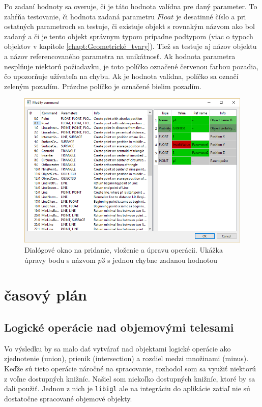 Po zadaní hodnoty sa overuje, či je táto hodnota valídna pre daný parameter. To zahŕňa testovanie, či hodnota zadaná parametru $Float$ je desatinné číslo a pri ostatných parametroch sa testuje, či existuje objekt s rovnakým názvom ako bol zadaný a či je tento objekt správnym typom prípadne podtypom (viac o typoch objektov v kapitole  \ref{chapt:Geometrické_tvary}). Tiež sa testuje aj názov objektu a názov referencovaného parametra na unikátnosť.
Ak hodnota parametra nesplňuje niektorú požiadavku, je toto políčko označené červenou farbou pozadia, čo upozorňuje užívateľa na chybu. Ak je hodnota valídna, políčko sa označí zeleným pozadím. Prázdne políčko je označené bielim pozadím. 

\begin{figure}[hbt]
	\centering
	\includegraphics[width=1\textwidth]{obrazky-figures/Dialog.png}
	\caption{Dialógové okno na pridanie, vloženie a úpravu operácii. Ukážka úpravy bodu s názvom $p3$ s jednou chybne zadanou hodnotou }
	\label{fig:dialogWindow}
\end{figure}

\chapter{časový plán}

\section{Logické operácie nad objemovými telesami}
Vo výsledku by sa malo dať vytvárať nad objektami logické operácie ako zjednotenie (union), prienik (intersection) a rozdiel medzi množinami (minus). Keďže sú tieto operácie náročné na spracovanie, rozhodol som sa využiť niektorú z voľne dostupných knižníc. Našiel som niekoľko dostupných knižníc, ktoré by sa dali použiť. Jednou z nich je \texttt{libigl}\cite{libigl} ale na integráciu do aplikácie zatiaľ nie sú dostatočne spracované objemové objekty.

